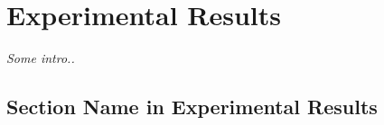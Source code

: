 \setlength{\footskip}{8mm}

\chapter{Experimental Results}
\label{ch:results}

\textit{Some intro..}

\section{Section Name in Experimental Results}
\label{section-name-in-experimental-results}


\FloatBarrier

